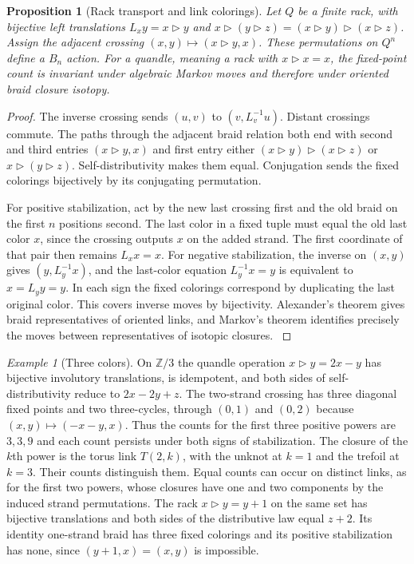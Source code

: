 \documentclass[aps,pra,onecolumn,superscriptaddress,nofootinbib,10pt]{revtex4-2}
\newtheorem{proposition}[theorem]{Proposition}
\theoremstyle{definition}
\theoremstyle{remark}
\newtheorem{example}[theorem]{Example}
\begin{document}
\begin{proposition}[Rack transport and link colorings]\label{cp:braid}
Let $Q$ be a finite rack, with bijective left translations $L_x y=x\triangleright y$ and $x\triangleright(y\triangleright z)=(x\triangleright y)\triangleright(x\triangleright z)$. Assign the adjacent crossing $(x,y)\mapsto(x\triangleright y,x)$. These permutations on $Q^n$ define a $B_n$ action. For a quandle, meaning a rack with $x\triangleright x=x$, the fixed-point count is invariant under algebraic Markov moves and therefore under oriented braid closure isotopy.
\end{proposition}
\begin{proof}
The inverse crossing sends $(u,v)$ to $(v,L_v^{-1}u)$. Distant crossings commute. The paths through the adjacent braid relation both end with second and third entries $(x\triangleright y,x)$ and first entry either $(x\triangleright y)\triangleright(x\triangleright z)$ or $x\triangleright(y\triangleright z)$. Self-distributivity makes them equal. Conjugation sends the fixed colorings bijectively by its conjugating permutation.

For positive stabilization, act by the new last crossing first and the old braid on the first $n$ positions second. The last color in a fixed tuple must equal the old last color $x$, since the crossing outputs $x$ on the added strand. The first coordinate of that pair then remains $L_x x=x$. For negative stabilization, the inverse on $(x,y)$ gives $(y,L_y^{-1}x)$, and the last-color equation $L_y^{-1}x=y$ is equivalent to $x=L_y y=y$. In each sign the fixed colorings correspond by duplicating the last original color. This covers inverse moves by bijectivity. Alexander's theorem gives braid representatives of oriented links, and Markov's theorem identifies precisely the moves between representatives of isotopic closures. \cite{n5-alexander,n5-birman}
\end{proof}

\begin{example}[Three colors]\label{cp:colors}
On $\mathbb Z/3$ the quandle operation $x\triangleright y=2x-y$ has bijective involutory translations, is idempotent, and both sides of self-distributivity reduce to $2x-2y+z$. The two-strand crossing has three diagonal fixed points and two three-cycles, through $(0,1)$ and $(0,2)$ because $(x,y)\mapsto(-x-y,x)$. Thus the counts for the first three positive powers are $3,3,9$ and each count persists under both signs of stabilization. The closure of the $k$th power is the torus link $T(2,k)$, with the unknot at $k=1$ and the trefoil at $k=3$. Their counts distinguish them. Equal counts can occur on distinct links, as for the first two powers, whose closures have one and two components by the induced strand permutations. The rack $x\triangleright y=y+1$ on the same set has bijective translations and both sides of the distributive law equal $z+2$. Its identity one-strand braid has three fixed colorings and its positive stabilization has none, since $(y+1,x)=(x,y)$ is impossible. \cite{n5-birman}
\end{example}
\end{document}
